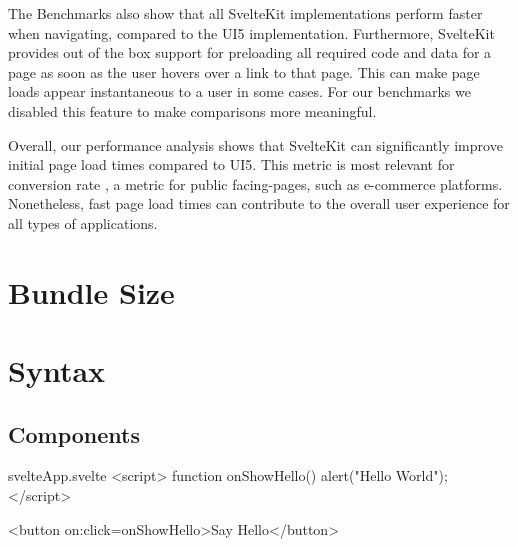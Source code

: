 The Benchmarks also show that all SvelteKit implementations perform faster when navigating, compared to the UI5 implementation. Furthermore, SvelteKit provides out of the box support for preloading all required code and data for a page as soon as the user hovers over a link to that page. This can make page loads appear instantaneous to a user in some cases. For our benchmarks we disabled this feature to make comparisons more meaningful.

Overall, our performance analysis shows that SvelteKit can significantly improve initial page load times compared to UI5. This metric is most relevant for conversion rate \cite{noauthor_load_nodate}, a metric for public facing-pages, such as e-commerce platforms. Nonetheless, fast page load times can contribute to the overall user experience for all types of applications. 


\section{Bundle Size}

\section{Syntax}

\subsection{Components}

\begin{myminted}{svelte}{App.svelte}
<script>
    function onShowHello() {
        alert("Hello World");
    }
</script>

<button on:click={onShowHello}>Say Hello</button>
\end{myminted}

